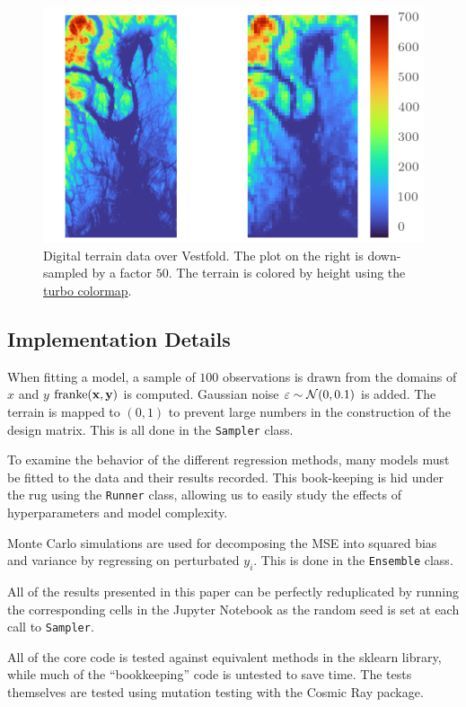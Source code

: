 \begin{figure}[]
  \centering
  \includegraphics[]{figures/terrain.png}
  \caption{\label{fig:terrain} Digital terrain data over Vestfold. The plot on
    the right is down-sampled by a factor \(50\). The terrain is colored by
    height using the
    \href{https://ai.googleblog.com/2019/08/turbo-improved-rainbow-colormap-for.html}{turbo
    colormap}.}
\end{figure}


\subsection{Implementation Details}

When fitting a model, a sample of \(100\) observations is drawn from the domains
of \(x\) and \(y\)
\(\text{franke}(\vb{x}, \vb{y})\) is computed. Gaussian noise \(\vb{\varepsilon}
\sim \mathcal{N}(0, 0.1)\) is added. The terrain is mapped to \((0, 1)\) to
prevent large numbers in the construction of the design matrix. This is all done in the \texttt{Sampler}
class.


To examine the behavior of the different regression methods, many models must be
fitted to the data and their results recorded. This book-keeping is hid under the rug using the
\texttt{Runner} class, allowing us to easily study the effects of
hyperparameters and model complexity.


Monte Carlo simulations are used for decomposing the MSE into squared bias and
variance by regressing on perturbated \(y_{i}\). This is done in the
\texttt{Ensemble} class.


All of the results presented in this paper can be perfectly reduplicated by running the
corresponding cells in the Jupyter Notebook as the random seed is set at each
call to \texttt{Sampler}.

All of the core code is tested against equivalent methods in the sklearn
library, while much of the ``bookkeeping'' code is untested to save time. The
tests themselves are tested using mutation testing with the Cosmic Ray package.